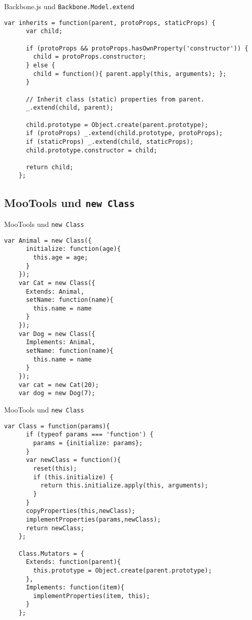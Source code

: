 \begin{frame}[fragile]{Backbone.js und \texttt{Backbone.Model.extend}}
  \begin{lstlisting}[gobble=4]
    var inherits = function(parent, protoProps, staticProps) {
      var child;
    
      if (protoProps && protoProps.hasOwnProperty('constructor')) {
        child = protoProps.constructor;
      } else {
        child = function(){ parent.apply(this, arguments); };
      }
    
      // Inherit class (static) properties from parent.
      _.extend(child, parent);
    
      child.prototype = Object.create(parent.prototype);
      if (protoProps) _.extend(child.prototype, protoProps);
      if (staticProps) _.extend(child, staticProps);
      child.prototype.constructor = child;
    
      return child;
    };
  \end{lstlisting}
\end{frame}

\subsection{MooTools und \texttt{new Class}}

\begin{frame}[fragile]{MooTools und \texttt{new Class}}
  \begin{lstlisting}[gobble=4]
    var Animal = new Class({
      initialize: function(age){
        this.age = age;
      }
    });
    var Cat = new Class({
      Extends: Animal,
      setName: function(name){
        this.name = name
      }
    });
    var Dog = new Class({
      Implements: Animal,
      setName: function(name){
        this.name = name
      }
    });
    var cat = new Cat(20);
    var dog = new Dog(7);
  \end{lstlisting}
\end{frame}

\begin{frame}[fragile]{MooTools und \texttt{new Class}}
  \begin{lstlisting}[gobble=4]
    var Class = function(params){
      if (typeof params === 'function') {
        params = {initialize: params};
      }
      var newClass = function(){
        reset(this);
        if (this.initialize) {
          return this.initialize.apply(this, arguments);
        }
      }
      copyProperties(this,newClass);
      implementProperties(params,newClass);
      return newClass;
    };
    
    Class.Mutators = {
      Extends: function(parent){
        this.prototype = Object.create(parent.prototype);
      },
      Implements: function(item){
        implementProperties(item, this);
      }
    };
  \end{lstlisting}
\end{frame}

